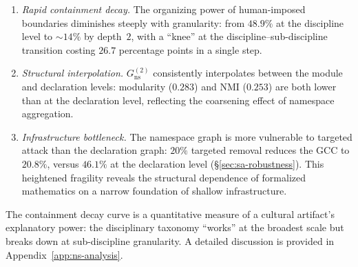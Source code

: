 \begin{enumerate}
    \item \textit{Rapid containment decay.} The organizing power of human-imposed boundaries diminishes steeply with granularity: from $48.9\%$ at the discipline level to ${\sim}14\%$ by depth~$2$, with a ``knee'' at the discipline--sub-discipline transition costing $26.7$ percentage points in a single step.

    \item \textit{Structural interpolation.} $G_{\mathrm{ns}}^{(2)}$ consistently interpolates between the module and declaration levels: modularity ($0.283$) and NMI ($0.253$) are both lower than at the declaration level, reflecting the coarsening effect of namespace aggregation.

    \item \textit{Infrastructure bottleneck.} The namespace graph is more vulnerable to targeted attack than the declaration graph: $20\%$ targeted removal reduces the GCC to $20.8\%$, versus $46.1\%$ at the declaration level (\S\ref{sec:sa-robustness}). This heightened fragility reveals the structural dependence of formalized mathematics on a narrow foundation of shallow infrastructure.
\end{enumerate}

\noindent
The containment decay curve is a quantitative measure of a cultural artifact's explanatory power: the disciplinary taxonomy ``works'' at the broadest scale but breaks down at sub-discipline granularity. A detailed discussion is provided in Appendix~\ref{app:ns-analysis}.
